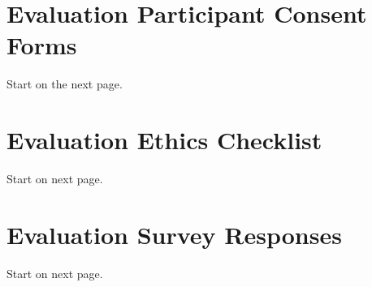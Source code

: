 \documentclass{l4proj}
\begin{document}
\begin{appendices}

\chapter{Evaluation Participant Consent Forms}
Start on the next page.












\chapter{Evaluation Ethics Checklist}
Start on next page.


\chapter{Evaluation Survey Responses}
Start on next page.












\end{appendices}
\end{document}
